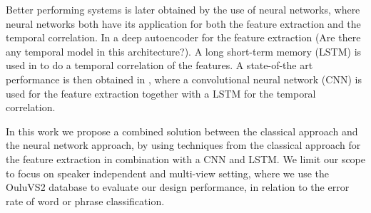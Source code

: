 Better performing systems is later obtained by the use of neural networks, where neural networks both have its application for both the feature extraction and the temporal correlation.
In \cite{Ngiam2011} a deep autoencoder for the feature extraction (Are there any temporal model in this architecture?).
A long short-term memory (LSTM) is used in \cite{Wand2016} to do a temporal correlation of the features.
A state-of-the art performance is then obtained in \cite{Lee}, where a convolutional neural network (CNN) is used for the feature extraction together with a LSTM for the temporal correlation.

In this work we propose a combined solution between the classical approach and the neural network approach, by using techniques from the classical approach for the feature extraction in combination with a CNN and LSTM.
We limit our scope to focus on speaker independent and multi-view setting, where we use the OuluVS2 database to evaluate our design performance, in relation to the error rate of word or phrase classification.
